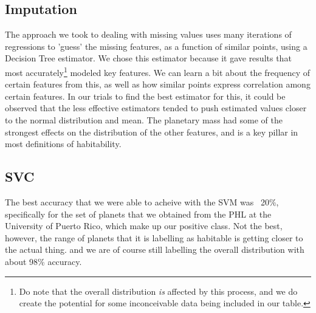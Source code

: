 \documentclass[11.5pt]{article}
\begin{document}
\subsection{Imputation}
The approach we took to dealing with missing values uses many iterations of regressions to 'guess' the missing features, as a function of similar points, using a Decision Tree estimator. We chose this estimator because it gave results that most accurately\footnote{Do note that the overall distribution \emph{is} affected by this process, and we do create the potential for some inconceivable data being included in our table.} modeled key features. We can learn a bit about the frequency of certain features from this, as well as how similar points express correlation among certain features. In our trials to find the best estimator for this, it could be observed that the less effective estimators tended to push estimated values closer to the normal distribution and mean. The planetary mass had some of the strongest effects on the distribution of the other features, and is a key pillar in most definitions of habitability.

\subsection{SVC}
The best accuracy that we were able to acheive with the SVM was ~20\%, specifically for the set of planets that we obtained from the PHL at the University of Puerto Rico, which make up our positive class. Not the best, however, the range of planets that it is labelling as habitable is getting closer to the actual thing. and we are of course still labelling the overall distribution with about 98\% accuracy.
\end{document}
